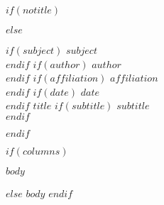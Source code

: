 \documentclass[letterpaper,$fontsize$,oneside]{article}
\begin{document}
\thispagestyle{empty}

$if(notitle)$

$else$
\begin{flushleft}
$if(subject)$
\rmfamily\large{$subject$} \\
$endif$
$if(author)$
\rmfamily\large{$author$} \\
$endif$
$if(affiliation)$
\rmfamily\large{$affiliation$}  \\
$endif$
$if(date)$
\rmfamily\large{$date$} \\
$endif$
\vspace{10mm}
\titlefont\huge{$title$} 
$if(subtitle)$
\titlefont\Large{$subtitle$} \\
$endif$
\end{flushleft}
\vspace{-.5cm}

$endif$


\singlespacing


$if(columns)$
\setlength{\columnsep}{5em}
\begin{multicols*}{2}
$body$
\end{multicols*}

$else$
$body$
$endif$
\end{document}
